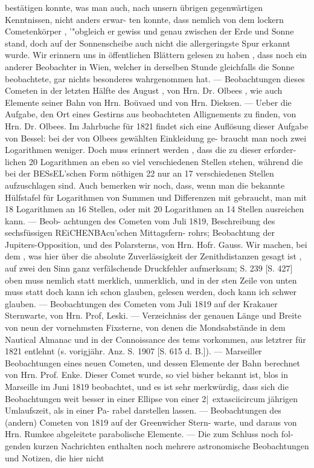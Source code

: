 \documentclass[12pt,a4paper]{article}
\begin{document}
{{{{{{{{bestätigen  konnte,  was  man  auch,  nach  unsern  übrigen  gegenwärtigen  Kenntnissen,  nicht  anders  erwar- ten konnte,  dass  nemlich  von  dem  lockern  Cometenkörper , '"obgleich  er  gewiss  und  genau  zwischen  der Erde  und  Sonne  stand,  doch  auf  der  Sonnenscheibe  auch  nicht  die  allergeringste  Spur  erkannt  wurde. Wir  erinnern  uns  in  öffentlichen  Blättern  gelesen  zu  haben ,  dass  noch  ein  anderer  Beobachter  in  Wien, welcher  in  derselben  Stunde  gleichfalls  die  Sonne  beobachtete,  gar  nichts  besonderes  wahrgenommen hat.  ---  Beobachtungen  dieses  Cometen  in  der  letzten  Hälfte  des  August ,  von  Hrn.  Dr.  Olbees  ,  wie auch  Elemente  seiner  Bahn  von  Hrn.  Boüvaed  und  von  Hrn.  Dieksen.  ---  Ueber  die  Aufgabe,  den  Ort eines  Gestirns  aus  beobachteten  Allignements  zu  finden,  von  Hrn.  Dr.  Olbees.  Im  Jahrbuche  für  1821 findet  sich  eine  Auflösung  dieser  Aufgabe  von  Bessel:  bei  der  von  Olbees  gewählten  Einkleidung  ge- braucht man  noch  zwei  Logarithmen  weniger.  Doch  muss  erinnert  werden ,  dass  die  zu  dieser  erforder- lichen 20  Logarithmen  an  eben  so  viel  verschiedenen  Stellen  stehen,  während  die  bei  der  BESsEL'schen Form  nöthigen  22  nur  an  17  verschiedenen  Stellen  aufzuschlagen  sind.  Auch  bemerken  wir  noch,  dass, wenn  man  die  bekannte  Hülfstafel  für  Logarithmen  von  Summen  und  Differenzen  mit  gebraucht,  man mit  18  Logarithmen  an  16  Stellen,  oder  mit  20  Logarithmen  an  14  Stellen  ausreichen  kann.  ---  Beob- achtungen des  Cometen  vom  Juli  1819,  Beschreibung  des  sechsfüssigen  REiCHENBAcu'schen  Mittagsfern- rohrs; Beobachtung  der  Jupiters-Opposition,  und  des  Polarsterns,  von  Hrn.  Hofr.  Gauss.  Wir  machen, bei  dem ,  was  hier  über  die  absolute  Zuverlässigkeit  der  Zenithdistanzen  gesagt  ist ,  auf  zwei  den  Sinn ganz  verfälschende  Druckfehler  aufmerksam;  S.  239  [S. 427]  oben  muss  nemlich  statt  merklich,  unmerklich, und  in  der  sten  Zeile  von  unten  muss  statt  doch  kann  ich  schon  glauben,  gelesen  werden,  doch  kann  ich schwer  glauben.  ---  Beobachtungen  des  Cometen  vom  Juli  1819  auf  der  Krakauer  Sternwarte,  von  Hrn. Prof,  Leski.  ---  Verzeichniss  der  genauen  Länge  und  Breite  von  neun  der  vornehmsten  Fixsterne,  von denen  die  Mondsabstände  in  dem  Nautical  Almanac  und  in  der  Connoissance  des  tems  vorkommen,  aus letztrer  für  1821  entlehnt  (s.  vorigjähr.  Anz.  S.  1907  [S.  615  d.  B.]).  ---  Marseiller  Beobachtungen  eines neuen  Cometen,  und  dessen  Elemente  der  Bahn  berechnet  von  Hrn.  Prof.  Enke.  Dieser  Comet  wurde, so  viel  bisher  bekannt  ist,  blos  in  Marseille  im  Juni  1819  beobachtet,  und  es  ist  sehr  merkwürdig,  dass sich  die  Beobachtungen  weit  besser  in  einer  Ellipse  von  einer  2|\	extasciicircum{}{ }jährigen  Umlaufszeit,  als  in  einer  Pa- rabel darstellen  lassen.  ---  Beobachtungen  des  (andern)  Cometen  von  1819  auf  der  Greenwicher  Stern- warte, und  daraus  von  Hrn.  Rumkee  abgeleitete  parabolische  Elemente.  ---  Die  zum  Schluss  noch  fol- genden kurzen  Nachrichten  enthalten  noch  mehrere  astronomische  Beobachtungen  und  Notizen,  die  hier nicht  }}}}}}}}
\end{document}
